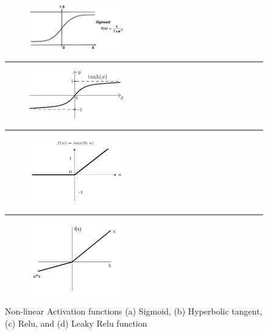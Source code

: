 \begin{figure}
    \centering
    
    \begin{subfigure}[]
        \centering
        \includegraphics[width=0.45\textwidth]{Images/sigmoid.png}
    \end{subfigure}
    \rule{1px}{100px}
    \begin{subfigure}[]
        \centering
        \includegraphics[width=0.45\textwidth]{Images/hypertan.png}
    \end{subfigure}
    \rule{\textwidth}{1pt}
     \begin{subfigure}[]
        \centering
        \includegraphics[width=0.45\textwidth]{Images/relu.png}
    \end{subfigure}
    \rule{1px}{120px}
    \begin{subfigure}[]
        \centering
        \includegraphics[width=0.45\textwidth]{Images/leakyrelu.png}
    \end{subfigure}   
    
    \caption{Non-linear Activation functions (a) Sigmoid, (b) Hyperbolic tangent, (c) Relu, and (d) Leaky Relu function \cite{coursera1}}
    \label{activations}
\end{figure} 

